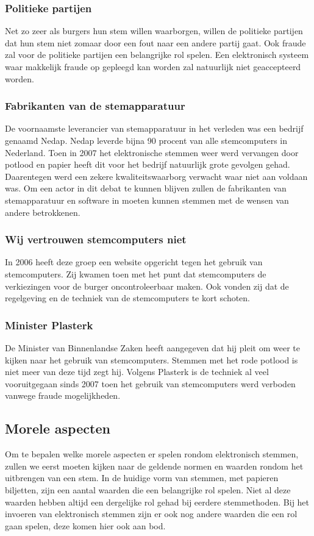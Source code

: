 \documentclass[a4paper]{article}
\begin{document}
\subsubsection{Politieke partijen}
Net zo zeer als burgers hun stem willen waarborgen, willen de politieke partijen dat hun stem niet zomaar door een fout naar een andere partij gaat.
Ook fraude zal voor de politieke partijen een belangrijke rol spelen. 
Een elektronisch systeem waar makkelijk fraude op gepleegd kan worden zal natuurlijk niet geaccepteerd worden.

\subsubsection{Fabrikanten van de stemapparatuur}
De voornaamste leverancier van stemapparatuur in het verleden was een bedrijf genaamd Nedap.
Nedap leverde bijna 90 procent van alle stemcomputers in Nederland.
Toen in 2007 het elektronische stemmen weer werd vervangen door potlood en papier heeft dit voor het bedrijf natuurlijk grote gevolgen gehad.
Daarentegen werd een zekere kwaliteitswaarborg verwacht waar niet aan voldaan was.
Om een actor in dit debat te kunnen blijven zullen de fabrikanten van stemapparatuur en software in moeten kunnen stemmen met de wensen van andere betrokkenen.

\subsubsection{Wij vertrouwen stemcomputers niet}
In 2006 heeft deze groep een website opgericht tegen het gebruik van stemcomputers. 
Zij kwamen toen met het punt dat stemcomputers de verkiezingen voor de burger oncontroleerbaar maken.
Ook vonden zij dat de regelgeving en de techniek van de stemcomputers te kort schoten.

\subsubsection{Minister Plasterk}
De Minister van Binnenlandse Zaken heeft aangegeven dat hij pleit om weer te kijken naar het gebruik van stemcomputers.
Stemmen met het rode potlood is niet meer van deze tijd zegt hij. 
Volgens Plasterk is de techniek al veel vooruitgegaan sinds 2007 toen het gebruik van stemcomputers werd verboden vanwege fraude mogelijkheden.


\subsection{Morele aspecten}
Om te bepalen welke morele aspecten er spelen rondom elektronisch stemmen, zullen we eerst moeten kijken naar de geldende normen en waarden rondom het uitbrengen van een stem.
In de huidige vorm van stemmen, met papieren biljetten, zijn een aantal waarden die een belangrijke rol spelen.
Niet al deze waarden hebben altijd een dergelijke rol gehad bij eerdere stemmethoden.
Bij het invoeren van elektronisch stemmen zijn er ook nog andere waarden die een rol gaan spelen, deze komen hier ook aan bod.
\end{document}
